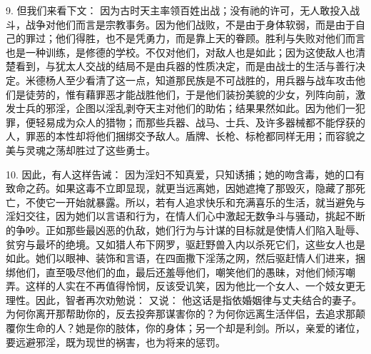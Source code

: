 9. 但我们来看下文： 因为古时天主率领百姓出战；没有祂的许可，无人敢投入战斗，战争对他们而言是宗教事务。因为他们战败，不是由于身体软弱，而是由于自己的罪过；他们得胜，也不是凭勇力，而是靠上天的眷顾。胜利与失败对他们而言也是一种训练，是修德的学校。不仅对他们，对敌人也是如此；因为这使敌人也清楚看到，与犹太人交战的结局不是由兵器的性质决定，而是由战士的生活与善行决定。米德杨人至少看清了这一点，知道那民族是不可战胜的，用兵器与战车攻击他们是徒劳的，惟有藉罪恶才能战胜他们，于是他们装扮美貌的少女，列阵向前，激发士兵的邪淫，企图以淫乱剥夺天主对他们的助佑；结果果然如此。因为他们一犯罪，便轻易成为众人的猎物；而那些兵器、战马、士兵、及许多器械都不能俘获的人，罪恶的本性却将他们捆绑交予敌人。盾牌、长枪、标枪都同样无用；而容貌之美与灵魂之荡却胜过了这些勇士。\par

10. 因此，有人这样告诫： 因为淫妇不知真爱，只知诱捕；她的吻含毒，她的口有致命之药。如果这毒不立即显现，就更当远离她，因她遮掩了那毁灭，隐藏了那死亡，不使它一开始就暴露。所以，若有人追求快乐和充满喜乐的生活，就当避免与淫妇交往，因为她们以言语和行为，在情人们心中激起无数争斗与骚动，挑起不断的争吵。正如那些最凶恶的仇敌，她们行为与计谋的目标就是使情人们陷入耻辱、贫穷与最坏的绝境。又如猎人布下网罗，驱赶野兽入内以杀死它们，这些女人也是如此。她们以眼神、装饰和言语，在四面撒下淫荡之网，然后驱赶情人们进来，捆绑他们，直至吸尽他们的血，最后还羞辱他们，嘲笑他们的愚昧，对他们倾泻嘲弄。这样的人实在不再值得怜悯，反该受讥笑，因为他比一个女人、一个妓女更无理性。因此，智者再次劝勉说： 又说： 他这话是指依婚姻律与丈夫结合的妻子。为何你离开那帮助你的，反去投奔那谋害你的？为何你远离生活伴侣，去追求那颠覆你生命的人？她是你的肢体，你的身体；另一个却是利剑。所以，亲爱的诸位，要远避邪淫，既为现世的祸害，也为将来的惩罚。\par

